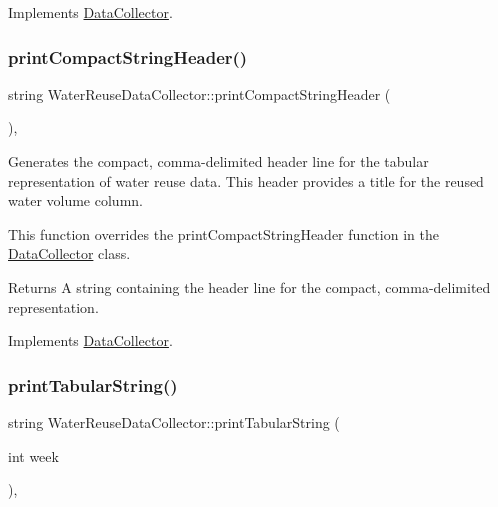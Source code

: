 Implements \mbox{\hyperlink{classDataCollector_a2eac264fa5612aed5a830b12de4f4ae3}{Data\+Collector}}.

\mbox{\label{classWaterReuseDataCollector_afef08bead3f2c60c2b9c975864456ef1}} 
\subsubsection{\texorpdfstring{print\+Compact\+String\+Header()}{printCompactStringHeader()}}
{\footnotesize\ttfamily string Water\+Reuse\+Data\+Collector\+::print\+Compact\+String\+Header (\begin{DoxyParamCaption}{ }\end{DoxyParamCaption})\hspace{0.3cm}{\ttfamily [override]}, {\ttfamily [virtual]}}



Generates the compact, comma-\/delimited header line for the tabular representation of water reuse data. This header provides a title for the reused water volume column. 

This function overrides the {\ttfamily print\+Compact\+String\+Header} function in the {\ttfamily \mbox{\hyperlink{classDataCollector}{Data\+Collector}}} class.

\begin{DoxyReturn}{Returns}
A string containing the header line for the compact, comma-\/delimited representation. 
\end{DoxyReturn}


Implements \mbox{\hyperlink{classDataCollector_a98dcb4ec871d9c7fbf7545c64e5ccc67}{Data\+Collector}}.

\mbox{\label{classWaterReuseDataCollector_af8b637ad080f354dc145f11580834da8}} 
\subsubsection{\texorpdfstring{print\+Tabular\+String()}{printTabularString()}}
{\footnotesize\ttfamily string Water\+Reuse\+Data\+Collector\+::print\+Tabular\+String (\begin{DoxyParamCaption}\item[{int}]{week }\end{DoxyParamCaption})\hspace{0.3cm}{\ttfamily [override]}, {\ttfamily [virtual]}}



